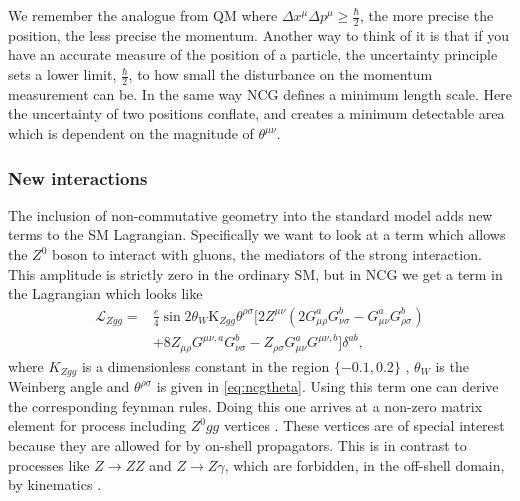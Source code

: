 We remember the analogue from QM where $\Delta x^{\mu} \Delta p^{\mu} \ge \frac{\hbar}{2}$, the more precise the position, the less precise the momentum. Another way to think of it is that if you have an accurate measure of the position of a particle, the uncertainty principle sets a lower limit, $\frac{\hbar}{2}$, to how small the disturbance on the momentum measurement can be. In the same way NCG defines a minimum length scale. Here the uncertainty of two positions conflate, and creates a minimum detectable area which is dependent on the magnitude of $\theta^{\mu \nu}$.

\subsubsection{New interactions}
The inclusion of non-commutative geometry into the standard model adds new terms to the SM Lagrangian. Specifically we want to look at a term which allows the $Z^0$ boson to interact with gluons, the mediators of the strong interaction. This amplitude is strictly zero in the ordinary SM, but in NCG we get a term in the Lagrangian which looks like \cite{melic2005smn}
\begin{align} \label{eq:zggterm}
	\mathcal{L}_{Zgg} = &\frac{e}{4}\sin{2\theta_W}\textrm{K}_{Zgg}\theta^{\rho\sigma}
	[2 Z^{\mu\nu} (2 G_{\mu\rho}^a G_{\nu\sigma}^b - G_{\mu\nu}^a G_{\rho\sigma}^b) \nonumber \\
	 &+ 8 Z_{\mu\rho} G^{\mu\nu,a} G_{\nu\sigma}^b - Z_{\rho\sigma} G_{\mu\nu}^a G^{\mu\nu,b}
	] \delta^{ab},
\end{align}
where $K_{Zgg}$ is a dimensionless constant in the region $\{-0.1,0.2\}$ \cite{behr2003dnc}, $\theta_W$ is the Weinberg angle and $\theta^{\rho\sigma}$ is given in \eqref{eq:ncgtheta}. Using this term one can derive the corresponding feynman rules. Doing this one arrives at a non-zero matrix element for process including $Z^0gg$ vertices \cite{melic2005smn}. These vertices are of special interest because they are allowed for by on-shell propagators. This is in contrast to processes like $Z \rightarrow ZZ$ and $Z \rightarrow Z\gamma$, which are forbidden, in the off-shell domain, by kinematics \cite{behr2003dnc}.
